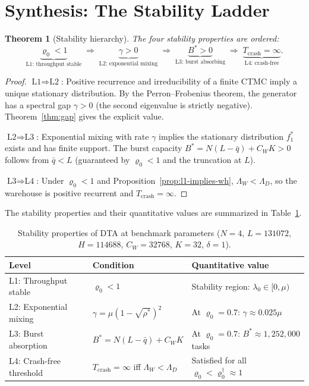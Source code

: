 \documentclass[11pt,a4paper]{report}
\newtheorem{theorem}{Theorem}[section]
\newcommand{\rhostar}{\rho^{*}}
\newcommand{\rhozero}{\varrho_0}
\newcommand{\lambdazero}{\lambda_0}
\newcommand{\qbar}{\bar{q}}
\begin{document}
\section{Synthesis: The Stability Ladder}

\begin{theorem}[Stability hierarchy]
\label{thm:hierarchy}
The four stability properties are ordered:
\[
  \underbrace{\rhozero < 1}_{\text{L1: throughput stable}}
  \;\Longrightarrow\;
  \underbrace{\gamma > 0}_{\text{L2: exponential mixing}}
  \;\Longrightarrow\;
  \underbrace{B^* > 0}_{\text{L3: burst absorbing}}
  \;\Longrightarrow\;
  \underbrace{T_{\mathrm{crash}} = \infty}_{\text{L4: crash-free}}.
\]
\end{theorem}

\begin{proof}
$\text{L1} \Rightarrow \text{L2}$:
Positive recurrence and irreducibility of a finite CTMC imply a
unique stationary distribution.
By the Perron--Frobenius theorem, the generator has a spectral gap
$\gamma > 0$ (the second eigenvalue is strictly negative).
Theorem~\ref{thm:gap} gives the explicit value.

$\text{L2} \Rightarrow \text{L3}$:
Exponential mixing with rate $\gamma$ implies the stationary distribution
$f_1^*$ exists and has finite support.
The burst capacity $B^* = N(L-\qbar) + C_WK > 0$ follows from
$\qbar < L$ (guaranteed by $\rhozero < 1$ and the truncation at $L$).

$\text{L3} \Rightarrow \text{L4}$:
Under $\rhozero < 1$ and Proposition~\ref{prop:l1-implies-wh},
$\Lambda_W < \Lambda_D$, so the warehouse is positive recurrent
and $T_{\mathrm{crash}} = \infty$.
\end{proof}

\medskip
\noindent The stability properties and their quantitative values are
summarized in Table~\ref{tab:summary}.

\begin{table}[h]
\centering
\caption{Stability properties of DTA at benchmark parameters
($N=4$, $L=131072$, $H=114688$, $C_W=32768$, $K=32$, $\delta=1$).}
\label{tab:summary}
\begin{tabular}{@{}lll@{}}
\toprule
Level & Condition & Quantitative value \\
\midrule
L1: Throughput stable    & $\rhozero < 1$
  & Stability region: $\lambdazero \in [0, \mu)$ \\
L2: Exponential mixing   & $\gamma = \mu(1-\sqrt{\rhostar})^2$
  & At $\rhozero=0.7$: $\gamma \approx 0.025\mu$ \\
L3: Burst absorption     & $B^* = N(L-\qbar) + C_WK$
  & At $\rhozero=0.7$: $B^* \approx 1{,}252{,}000$ tasks \\
L4: Crash-free threshold & $T_{\mathrm{crash}} = \infty$ iff $\Lambda_W < \Lambda_D$
  & Satisfied for all $\rhozero < \rhozero^\dagger \approx 1$ \\
\bottomrule
\end{tabular}
\end{table}
\end{document}
